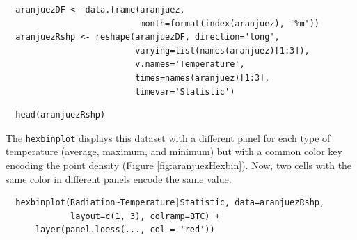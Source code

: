 \documentclass[smallroyalvopaper]{memoir}
\begin{document}

\lstset{language=r,label= ,caption= ,captionpos=b,numbers=none}
\begin{lstlisting}
  aranjuezDF <- data.frame(aranjuez,
                           month=format(index(aranjuez), '%m'))
  aranjuezRshp <- reshape(aranjuezDF, direction='long',
                          varying=list(names(aranjuez)[1:3]),
                          v.names='Temperature',
                          times=names(aranjuez)[1:3],
                          timevar='Statistic')
\end{lstlisting}


\lstset{language=r,label= ,caption= ,captionpos=b,numbers=none}
\begin{lstlisting}
  head(aranjuezRshp)
\end{lstlisting}

The \texttt{hexbinplot} displays this dataset with a different panel for
each type of temperature (average, maximum, and minimum) but with a
common color key encoding the point density (Figure
\ref{fig:aranjuezHexbin}). Now, two cells with the same color in
different panels encode the same value. 

\lstset{language=r,label= ,caption= ,captionpos=b,numbers=none}
\begin{lstlisting}
  hexbinplot(Radiation~Temperature|Statistic, data=aranjuezRshp,
             layout=c(1, 3), colramp=BTC) +
      layer(panel.loess(..., col = 'red'))
\end{lstlisting}
\end{document}
